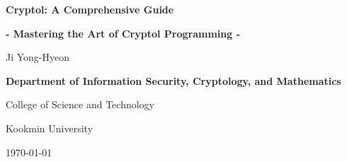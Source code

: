 \documentclass[12pt,openany]{book}
\theoremstyle{definition}
\begin{document}
	
	\begin{titlepage}
		\begin{center}
			{\Huge\textsf{\textbf{Cryptol: A Comprehensive Guide}}\par}
			{\Large\textsf{\textbf{- Mastering the Art of Cryptol Programming -}}\par}
			\vspace{0.5in}
			{\Large {Ji Yong-Hyeon}\par}
			\vspace{1in}
			\vspace{1in}
			{\large\bf \textsf{Department of Information Security, Cryptology, and Mathematics}\par}
			{\textsf{College of Science and Technology}\par}
			{\textsf{Kookmin University}\par}
			\vspace{.25in}
			{\large \textsf{\today}\par}
		\end{center}
	\end{titlepage}
	
	\frontmatter
	
%	
	
	\newpage
	\tableofcontents
	
	\newpage
	\mainmatter
%	
%	
	
	\appendix
%	
%	
%	
	
	\backmatter
	
\end{document}
